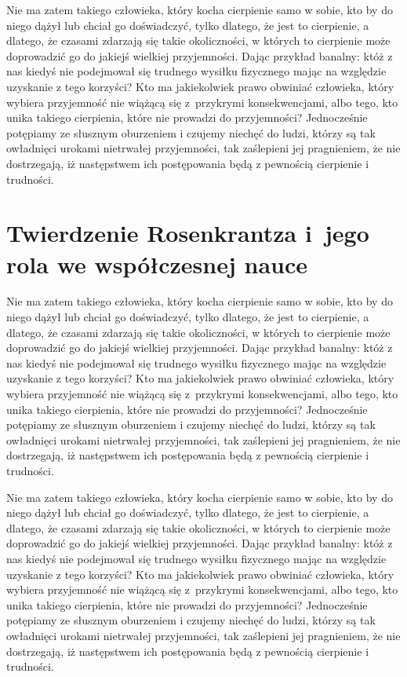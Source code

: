 \documentclass[12pt]{mwbk}
\theoremstyle{plain}
\theoremstyle{definition}
\theoremstyle{remark}
\begin{document}
Nie ma zatem takiego człowieka, który kocha cierpienie samo w sobie, 
kto by do niego dążył lub chciał go doświadczyć, tylko dlatego, że
jest to cierpienie, a dlatego, że czasami zdarzają się takie 
okoliczności, w których to cierpienie może doprowadzić 
go do jakiejś wielkiej przyjemności. 
Dając przykład banalny: któż z nas kiedyś nie podejmował 
się trudnego wysiłku fizycznego mając na względzie 
uzyskanie z tego korzyści? 
Kto ma jakiekolwiek prawo obwiniać człowieka, 
który wybiera przyjemność nie wiążącą się z~przykrymi 
konsekwencjami, albo tego, kto unika takiego cierpienia, 
które nie prowadzi do przyjemności? 
Jednocześnie potępiamy ze słusznym oburzeniem i czujemy 
niechęć do ludzi, którzy są tak owładnięci urokami nietrwałej 
przyjemności, tak zaślepieni jej pragnieniem, 
że nie dostrzegają, iż następstwem ich 
postępowania będą z pewnością cierpienie i trudności.



\chapter{Twierdzenie Rosenkrantza i~jego rola we współczesnej nauce}

Nie ma zatem takiego człowieka, który kocha cierpienie samo w sobie, 
kto by do niego dążył lub chciał go doświadczyć, tylko dlatego, że
jest to cierpienie, a dlatego, że czasami zdarzają się takie 
okoliczności, w których to cierpienie może doprowadzić 
go do jakiejś wielkiej przyjemności. 
Dając przykład banalny: któż z nas kiedyś nie podejmował 
się trudnego wysiłku fizycznego mając na względzie 
uzyskanie z tego korzyści? 
Kto ma jakiekolwiek prawo obwiniać człowieka, 
który wybiera przyjemność nie wiążącą się z~przykrymi 
konsekwencjami, albo tego, kto unika takiego cierpienia, 
które nie prowadzi do przyjemności? 
Jednocześnie potępiamy ze słusznym oburzeniem i czujemy 
niechęć do ludzi, którzy są tak owładnięci urokami nietrwałej 
przyjemności, tak zaślepieni jej pragnieniem, 
że nie dostrzegają, iż następstwem ich 
postępowania będą z pewnością cierpienie i trudności.





Nie ma zatem takiego człowieka, który kocha cierpienie samo w sobie, 
kto by do niego dążył lub chciał go doświadczyć, tylko dlatego, że
jest to cierpienie, a dlatego, że czasami zdarzają się takie 
okoliczności, w których to cierpienie może doprowadzić 
go do jakiejś wielkiej przyjemności. 
Dając przykład banalny: któż z nas kiedyś nie podejmował 
się trudnego wysiłku fizycznego mając na względzie 
uzyskanie z tego korzyści? 
Kto ma jakiekolwiek prawo obwiniać człowieka, 
który wybiera przyjemność nie wiążącą się z~przykrymi 
konsekwencjami, albo tego, kto unika takiego cierpienia, 
które nie prowadzi do przyjemności? 
Jednocześnie potępiamy ze słusznym oburzeniem i czujemy 
niechęć do ludzi, którzy są tak owładnięci urokami nietrwałej 
przyjemności, tak zaślepieni jej pragnieniem, 
że nie dostrzegają, iż następstwem ich 
postępowania będą z pewnością cierpienie i trudności.
\end{document}
